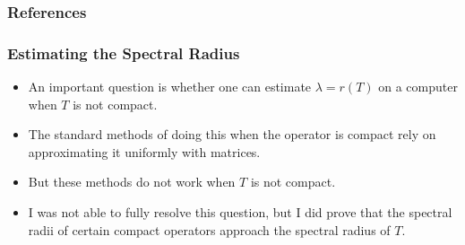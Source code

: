 \documentclass{beamer}
\begin{document}
\begin{frame}[allowframebreaks]
	\frametitle{References}
		\printbibliography
\end{frame}

\begin{frame}
	\frametitle{Estimating the Spectral Radius}
	\begin{itemize}
		\item An important question is whether one can estimate $\lambda = r(T)$ on a computer when $T$ is not compact.
		\pause
		\item The standard methods of doing this when the operator is compact rely on approximating it uniformly with matrices.
		\pause
		\item But these methods do not work when $T$ is not compact.
		\pause
		\item I was not able to fully resolve this question, but I did prove that the spectral radii of certain compact operators approach the spectral radius of $T$.
	\end{itemize}
\end{frame}


\end{document}
